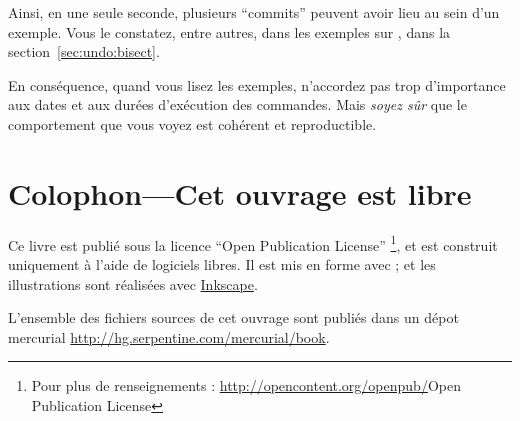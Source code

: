 Ainsi, en une seule seconde, plusieurs ``commits'' peuvent avoir lieu
au sein d'un exemple. Vous le constatez, entre autres, dans les 
exemples sur , dans la section~\ref{sec:undo:bisect}.

En conséquence, quand vous lisez les exemples, n'accordez pas trop
d'importance aux dates et aux durées d'exécution des commandes. Mais
\emph{soyez sûr} que le comportement que vous voyez est cohérent et
reproductible.

\section{Colophon---Cet ouvrage est libre}

Ce livre est publié sous la licence ``Open Publication License''
\footnote{Pour plus de renseignements : 
\url{http://opencontent.org/openpub/}{Open Publication License} }, 
et est construit uniquement à l'aide de logiciels libres. Il est mis
en forme avec \LaTex{}; et les illustrations sont réalisées avec 
\href{http://www.inkscape.org/}{Inkscape}.

L'ensemble des fichiers sources de cet ouvrage sont publiés dans un
dépot mercurial  \url{http://hg.serpentine.com/mercurial/book}.

